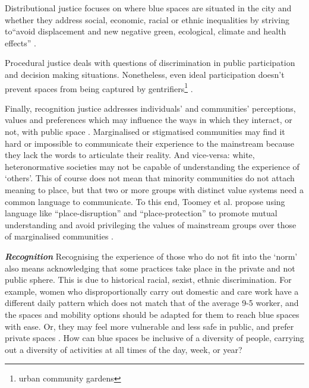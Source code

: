 \documentclass{article}
\newcommand{\bisection}[1]{\textbf{\textit{#1}}}
\begin{document}
Distributional justice focuses on where blue spaces are situated in the city and whether they address social, economic, racial or ethnic inequalities by striving to``avoid displacement and new negative green, ecological, climate and health effects'' \parencite{anguelovski2020expanding}.

Procedural justice deals with questions of discrimination in public participation and decision making situations. Nonetheless, even ideal participation doesn't prevent spaces from being captured by gentrifiers\footnote{urban community gardens} \parencite{anguelovski2020expanding}.

Finally, recognition justice addresses individuals' and communities’ perceptions, values and preferences which may influence the ways in which they interact, or not, with public space \parencite{anguelovski2020expanding}.
Marginalised or stigmatised communities may find it hard or impossible to communicate their experience to the mainstream because they lack the words to articulate their reality. And vice-versa: white, heteronormative societies may not be capable of understanding the experience of `others'. This of course does not mean that minority communities do not attach meaning to place, but that two or more groups with distinct value systems need a common language to communicate. To this end, Toomey et al. propose using language like ``place-disruption'' and ``place-protection'' to promote mutual understanding and avoid privileging the values of mainstream groups over those of marginalised communities \parencite{toomey2021place}.

\bisection{Recognition}
Recognising the experience of those who do not fit into the `norm' also means acknowledging that some practices take place in the private and not public sphere. This is due to historical racial, sexist, ethnic discrimination. For example, women who disproportionally carry out domestic and care work have a different daily pattern which does not match that of the average 9-5 worker, and the spaces and mobility options should be adapted for them to reach blue spaces with ease. Or, they may feel more vulnerable and less safe in public, and prefer private spaces \parencite{wessells2014urban}. How can blue spaces be inclusive of a diversity of people, carrying out a diversity of activities at all times of the day, week, or year? 

\end{document}
